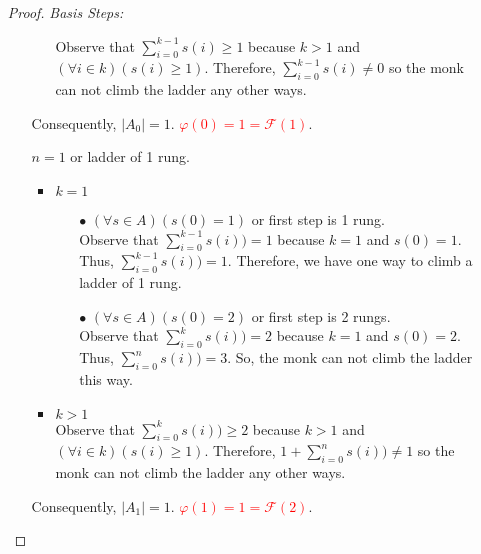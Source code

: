 \documentclass{article}
\newcommand{\fibonacci}{\mathcal{F}}
\newenvironment{case}[1][Case]
    {\par\textit{#1:}\hfill\break}
    {}
\begin{document}
\begin{enumerate}
\begin{proof}
\begin{case}[Basis Steps]
\begin{enumerate}
\begin{itemize}
                        Observe that $\sum_{i=0}^{k-1}s(i)\geq 1$ because $k > 1$ and $(\forall i \in k)(s(i) \geq 1)$. Therefore, $\sum_{i=0}^{k-1}s(i) \neq 0$ so the monk can not climb the ladder any other ways.
                \end{itemize}
                Consequently, $|A_0|=1$. \textcolor{red}{$\varphi(0)=1=\fibonacci(1)$}.
            \item []$n=1$ or ladder of 1 rung.
                \begin{itemize}
                    \item $k=1$
                    \begin{itemize}
                        \item [$\bullet$]$(\forall s \in A)(s(0)=1)$ or first step is 1 rung.\\
                            Observe that $\sum_{i=0}^{k-1}s(i))=1$ because $k= 1$ and $s(0) = 1$. Thus, $\sum_{i=0}^{k-1}s(i))= 1$. Therefore, we have one way to climb a ladder of 1 rung.
                        \item [$\bullet$]$(\forall s \in A)(s(0)=2)$ or first step is 2 rungs.\\
                            Observe that $\sum_{i=0}^{k}s(i))=2$ because $k=1$ and $s(0)=2$. Thus, $\sum_{i=0}^{n}s(i))=3$. So, the monk can not climb the ladder this way.
                    \end{itemize}
                    \item $k>1$\\
                    Observe that $\sum_{i=0}^{k}s(i))\geq 2$ because $k > 1$ and $(\forall i \in k)(s(i) \geq 1)$. Therefore, $1+\sum_{i=0}^{n}s(i)) \neq 1$ so the monk can not climb the ladder any other ways.
                \end{itemize}
            Consequently, $|A_1|=1$. \textcolor{red}{$\varphi(1)=1=\fibonacci(2)$}.
        \end{enumerate}
        

\end{case}
\end{proof}
\end{enumerate}
\end{document}
